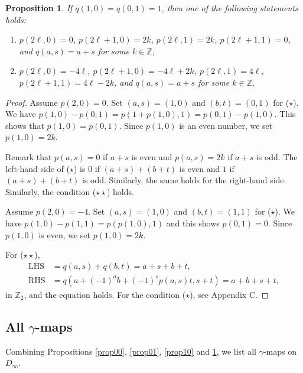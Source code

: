 \documentclass[12pt]{amsart}
\newtheorem{prop}[thm]{Proposition}
\theoremstyle{definition}
\newcommand{\Z}{\mathbb{Z}}
\begin{document}
\begin{prop}\label{prop11}
  If $q(1,0)=q(0,1)=1$, then one of the following statements holds:
  \begin{enumerate}[{\rm (1)}]
    \item  $p(2\ell,0) = 0$,
    $p(2\ell+1,0) = 2k$,
    $p(2\ell,1) = 2k$,
    $p(2\ell+1,1) = 0$, and
    $q(a,s)= a+s$ for some $k\in \Z$,
    \item
    $p(2\ell,0) = -4\ell$,
    $p(2\ell+1,0) = -4\ell+2k$,
    $p(2\ell,1) = 4\ell$,
    $p(2\ell+1,1) = 4\ell-2k$, and
    $q(a,s)= a+s$ for some $k\in \Z$.
  \end{enumerate}
\end{prop}

\begin{proof}
  Assume $p(2,0)=0$.
  Set $(a,s)=(1,0)$ and $(b,t)=(0,1)$ for ($\star$).
  We have $p(1,0)-p(0,1)=p(1+p(1,0),1)=p(0,1)-p(1,0)$.
  This shows that $p(1,0)=p(0,1)$.
  Since $p(1,0)$ is an even number, we set $p(1,0)=2k$.

  Remark that $p(a,s)=0$ if $a+s$ is even and $p(a,s)=2k$ if $a+s$ is odd.
  The left-hand side of ($\star$) is $0$ if $(a+s)+(b+t)$ is even and
  $1$ if $(a+s)+(b+t)$ is odd.
  Similarly, the same holds for the right-hand side.
  Similarly, the condition ($\star\star$) holds. 

  Assume $p(2,0)=-4$.
  Set $(a,s)=(1,0)$ and $(b,t)=(1,1)$ for ($\star$).
  We have $p(1,0)-p(1,1)=p(p(1,0),1)$ and this shows $p(0,1)=0$.
  Since $p(1,0)$ is even, we set $p(1,0)=2k$.

  For ($\star\star$),
  \begin{align*}
    \text{LHS} &= q(a,s)+q(b,t)=a+s+b+t,\\
    \text{RHS} &= q(a+(-1)^ab+(-1)^sp(a,s)t,s+t)=a+b+s+t,
  \end{align*}
  in $\Z_2$, and the equation holds.
  For the condition ($\star$), see Appendix C.
\end{proof}

\subsection{All $\gamma$-maps}
Combining Propositions \ref{prop00}, \ref{prop01},
\ref{prop10} and \ref{prop11},
we list all $\gamma$-maps on $D_\infty$.
\end{document}
